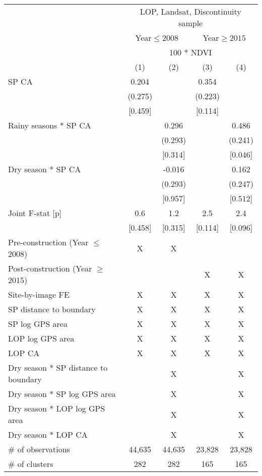 \begin{tabular}{lcccc}
\hline \hline
 & \multicolumn{4}{c}{LOP, Landsat, Discontinuity sample} \\
\cmidrule(lr){2-5}
 & \multicolumn{2}{c}{Year$\leq 2008$} & \multicolumn{2}{c}{Year$\geq 2015$} \\
\cmidrule(lr){2-3}\cmidrule(lr){4-5}
 & \multicolumn{4}{c}{100 * NDVI} \\
\cmidrule(lr){2-5}
 & (1) & (2) & (3) & (4) \\
\hline
SP CA & 0.204 &  & 0.354 &  \\
 & (0.275) &  & (0.223) &  \\
 & [0.459] &  & [0.114] &  \\
Rainy seasons * SP CA &  & 0.296 &  & 0.486 \\
 &  & (0.293) &  & (0.241) \\
 &  & [0.314] &  & [0.046] \\
Dry season * SP CA &  & -0.016\hphantom{-} &  & 0.162 \\
 &  & (0.293) &  & (0.247) \\
 &  & [0.957] &  & [0.512] \\
Joint F-stat [p] & 0.6 & 1.2 & 2.5 & 2.4 \\
 & [0.458] & [0.315] & [0.114] & [0.096] \\
\hline
Pre-construction (Year $\leq$2008) & X & X &  &  \\
Post-construction (Year $\geq$2015) &  &  & X & X \\
Site-by-image FE & X & X & X & X \\
SP distance to boundary & X & X & X & X \\
SP log GPS area & X & X & X & X \\
LOP log GPS area & X & X & X & X \\
LOP CA & X & X & X & X \\
Dry season * SP distance to boundary &  & X &  & X \\
Dry season * SP log GPS area &  & X &  & X \\
Dry season * LOP log GPS area &  & X &  & X \\
Dry season * LOP CA &  & X &  & X \\
\# of observations & 44,635 & 44,635 & 23,828 & 23,828 \\
\# of clusters & 282 & 282 & 165 & 165 \\
\hline
\end{tabular}
